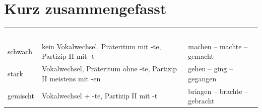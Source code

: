 \documentclass[a4paper,11pt]{article}
\begin{document}
    
    \section{Kurz zusammengefasst}
        
        \begin{tabular}{>{\raggedright\arraybackslash}p{4cm} >{\raggedright\arraybackslash}p{5cm} >{\raggedright\arraybackslash}p{5cm}}
            \rowcolor{HeaderBlueDark}
            \textcolor{white}{\textbf{Gruppe}} &
            \textcolor{white}{\textbf{Merkmal}} &
            \textcolor{white}{\textbf{Beispiel}} \\
            
            \rowcolor{RowBlueLight}
            schwach &
            kein Vokalwechsel, Präteritum mit -te, Partizip II mit -t &
            machen -- machte -- gemacht \\
            
            \rowcolor{RowBlueDark}
            stark &
            Vokalwechsel, Präteritum ohne -te, Partizip II meistens mit -en &
            gehen -- ging -- gegangen \\
            
            \rowcolor{RowBlueLight}
            gemischt &
            Vokalwechsel + -te, Partizip II mit -t &
            bringen -- brachte -- gebracht \\
        \end{tabular}
\end{document}
